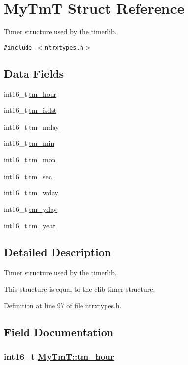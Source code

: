 \hypertarget{structMyTmT}{
\section{My\-Tm\-T Struct Reference}
\label{structMyTmT}
}
Timer structure used by the timerlib.  


{\tt \#include $<$ntrxtypes.h$>$}

\subsection*{Data Fields}
\begin{CompactItemize}
\item 
int16\_\-t \hyperlink{structMyTmT_30848115ceb725549043f81bc3fff442}{tm\_\-hour}
\item 
int16\_\-t \hyperlink{structMyTmT_0401d4746fa48608fe3466d5bc5f9fee}{tm\_\-isdst}
\item 
int16\_\-t \hyperlink{structMyTmT_7cc2f1da8cb1ebf0dfcdea2f3c07f85a}{tm\_\-mday}
\item 
int16\_\-t \hyperlink{structMyTmT_fb56232ae9856cbf577da4e60a8fc551}{tm\_\-min}
\item 
int16\_\-t \hyperlink{structMyTmT_c565f90f9f1a8b1679f6e614e2138170}{tm\_\-mon}
\item 
int16\_\-t \hyperlink{structMyTmT_136d95defb2f233df5af719b09e7eea7}{tm\_\-sec}
\item 
int16\_\-t \hyperlink{structMyTmT_22777f0b7044d8af1f4f5b93cc3faac6}{tm\_\-wday}
\item 
int16\_\-t \hyperlink{structMyTmT_dcf1c6eb3a918d22d866d960e2a813db}{tm\_\-yday}
\item 
int16\_\-t \hyperlink{structMyTmT_6e7bdc1bd327a2bb486c68d9088b2a5e}{tm\_\-year}
\end{CompactItemize}


\subsection{Detailed Description}
Timer structure used by the timerlib. 

This structure is equal to the clib timer structure. 



Definition at line 97 of file ntrxtypes.h.

\subsection{Field Documentation}
\hypertarget{structMyTmT_30848115ceb725549043f81bc3fff442}{
\subsubsection[tm\_\-hour]{\setlength{\rightskip}{0pt plus 5cm}int16\_\-t \hyperlink{structMyTmT_30848115ceb725549043f81bc3fff442}{My\-Tm\-T::tm\_\-hour}}}
\label{structMyTmT_30848115ceb725549043f81bc3fff442}




